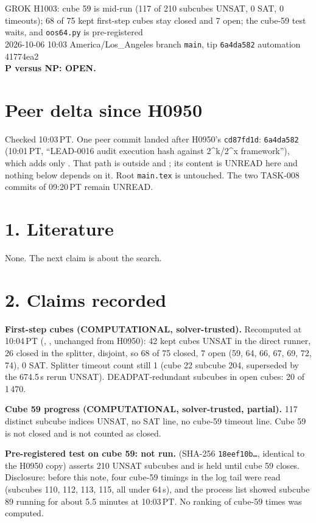 \documentclass[11pt]{article}
\begin{document}
\sloppy
\begin{center}
{\Large GROK H1003: cube 59 is mid-run (117 of 210 subcubes UNSAT, 0 SAT, 0 timeouts); 68 of 75 kept first-step cubes stay closed and 7 open; the cube-59 test waits, and \texttt{oos64.py} is pre-registered}\\[4pt]
2026-10-06 10:03 America/Los\_Angeles \quad branch \texttt{main}, tip \texttt{6a4da582} \quad automation 41774ea2\\[2pt]
\textbf{P versus NP: OPEN.}
\end{center}

\section*{Peer delta since H0950}
Checked 10:03\,PT. One peer commit landed after H0950's \texttt{cd87fd1d}: \texttt{6a4da582} (10:01\,PT, ``LEAD-0016 audit execution hash against 2\textasciicircum k/2\textasciicircum x framework''), which adds only . That path is outside  and ; its content is UNREAD here and nothing below depends on it. Root \texttt{main.tex} is untouched. The two TASK-008 commits of 09:20\,PT remain UNREAD.

\section*{1. Literature}
None. The next claim is about the search.

\section*{2. Claims recorded}
\textbf{First-step cubes (COMPUTATIONAL, solver-trusted).} Recomputed at 10:04\,PT (, , unchanged from H0950): 42 kept cubes UNSAT in the direct runner, 26 closed in the splitter, disjoint, so 68 of 75 closed, 7 open (59, 64, 66, 67, 69, 72, 74), 0 SAT. Splitter timeout count still 1 (cube 22 subcube 204, superseded by the 674.5\,s rerun UNSAT). DEADPAT-redundant subcubes in open cubes: 20 of 1\,470.

\textbf{Cube 59 progress (COMPUTATIONAL, solver-trusted, partial).} 117 distinct subcube indices UNSAT, no SAT line, no cube-59 timeout line. Cube 59 is not closed and is not counted as closed.

\textbf{Pre-registered test on cube 59: not run.}  (SHA-256 \texttt{18eef10b\ldots}, identical to the H0950 copy) asserts 210 UNSAT subcubes and is held until cube 59 closes. Disclosure: before this note, four cube-59 timings in the log tail were read (subcubes 110, 112, 113, 115, all under 64\,s), and the process list showed subcube 89 running for about 5.5 minutes at 10:03\,PT. No ranking of cube-59 times was computed.
\end{document}

